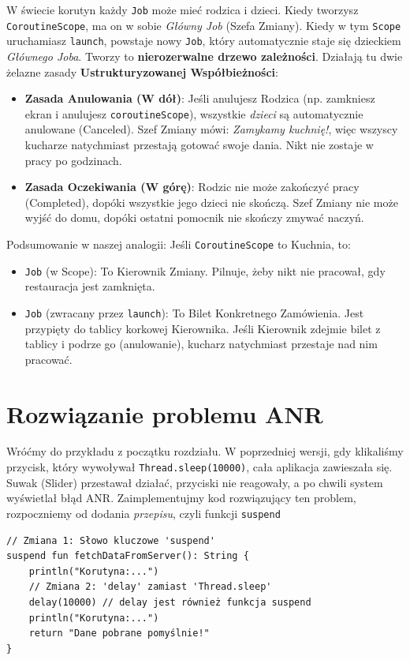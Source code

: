 W świecie korutyn każdy \texttt{Job} może mieć rodzica i dzieci. Kiedy tworzysz \texttt{CoroutineScope}, ma on w sobie \textit{Główny Job} (Szefa Zmiany). Kiedy w tym \texttt{Scope} uruchamiasz \texttt{launch}, powstaje nowy \texttt{Job}, który automatycznie staje się dzieckiem \textit{Głównego Joba}. Tworzy to \textbf{nierozerwalne drzewo zależności}. Działają tu dwie żelazne zasady \textbf{Ustrukturyzowanej Współbieżności}:
\begin{itemize}
\item \textbf{Zasada Anulowania (W dół)}: Jeśli anulujesz Rodzica (np. zamkniesz ekran i anulujesz \texttt{coroutineScope}), wszystkie \textit{dzieci} są automatycznie anulowane (Canceled). Szef Zmiany mówi: \textit{Zamykamy kuchnię!}, więc wszyscy kucharze natychmiast przestają gotować swoje dania. Nikt nie zostaje w pracy po godzinach.
\item \textbf{Zasada Oczekiwania (W górę)}: Rodzic nie może zakończyć pracy (Completed), dopóki wszystkie jego dzieci nie skończą. Szef Zmiany nie może wyjść do domu, dopóki ostatni pomocnik nie skończy zmywać naczyń.
\end{itemize}

Podsumowanie w naszej analogii:
Jeśli \texttt{CoroutineScope} to Kuchnia, to:
\begin{itemize}
\item \texttt{Job} (w Scope): To Kierownik Zmiany. Pilnuje, żeby nikt nie pracował, gdy restauracja jest zamknięta.
\item \texttt{Job} (zwracany przez \texttt{launch}): To Bilet Konkretnego Zamówienia. Jest przypięty do tablicy korkowej Kierownika. Jeśli Kierownik zdejmie bilet z tablicy i podrze go (anulowanie), kucharz natychmiast przestaje nad nim pracować.
\end{itemize}

\section{Rozwiązanie problemu ANR}

Wróćmy do przykładu z początku rozdziału. W poprzedniej wersji, gdy klikaliśmy przycisk, który wywoływał \texttt{Thread.sleep(10000)}, cała aplikacja zawieszała się. Suwak (Slider) przestawał działać, przyciski nie reagowały, a po chwili system wyświetlał błąd ANR. Zaimplementujmy kod rozwiązujący ten problem, rozpoczniemy od dodania \textit{przepisu}, czyli funkcji \texttt{suspend}

\begin{verbatim}
// Zmiana 1: Słowo kluczowe 'suspend'
suspend fun fetchDataFromServer(): String {
    println("Korutyna:...")
    // Zmiana 2: 'delay' zamiast 'Thread.sleep'
    delay(10000) // delay jest również funkcja suspend
    println("Korutyna:...")
    return "Dane pobrane pomyślnie!"
}
\end{verbatim}

